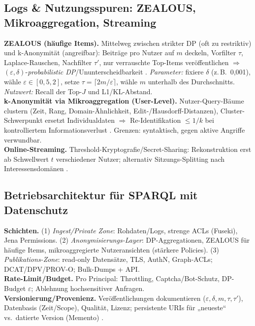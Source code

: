 \subsection{Logs \& Nutzungsspuren: ZEALOUS, Mikroaggregation, Streaming}
\textbf{ZEALOUS (häufige Items).} Mittelweg zwischen strikter DP (oft zu restriktiv) und k-Anonymität (angreifbar): Beiträge pro Nutzer auf $m$ deckeln, Vorfilter $\tau$, Laplace-Rauschen, Nachfilter $\tau'$, nur verrauschte Top-Items veröffentlichen $\Rightarrow$ $(\varepsilon,\delta)$-\emph{probabilistic DP}/Ununterscheidbarkeit \cite{GoetzZealous}. \emph{Parameter:} fixiere $\delta$ (z.\,B.\ 0{,}001), wähle $\varepsilon\in[0{,}5,2]$, setze $\tau=\lceil2m/\varepsilon\rceil$, wähle $m$ unterhalb des Durchschnitts. \emph{Nutzwert:} Recall der Top-$J$ und L1/KL-Abstand. \\
\textbf{k-Anonymität via Mikroaggregation (User-Level).} Nutzer-Query-Bäume clustern (Zeit, Rang, Domain-Ähnlichkeit, Edit-/Hausdorff-Distanzen), Cluster-Schwerpunkt ersetzt Individualdaten $\Rightarrow$ Re-Identifikation $\le 1/k$ bei kontrolliertem Informationsverlust \cite{NavarroUserKAnon}. Grenzen: syntaktisch, gegen aktive Angriffe verwundbar. \\
\textbf{Online-Streaming.} Threshold-Kryptografie/Secret-Sharing: Rekonstruktion erst ab Schwellwert $t$ verschiedener Nutzer; alternativ Sitzungs-Splitting nach Interessensdomänen \cite{AdarQueryLogs}.

\subsection{Betriebsarchitektur für SPARQL mit Datenschutz}
\label{sec:privacy-governance}
\textbf{Schichten.} (1) \emph{Ingest/Private Zone}: Rohdaten/Logs, strenge ACLs (Fuseki), Jena Permissions. (2) \emph{Anonymisierungs-Layer}: DP-Aggregationen, ZEALOUS für häufige Items, mikroaggregierte Nutzeransichten (stärkere Policies). (3) \emph{Publikations-Zone}: read-only Datensätze, TLS, AuthN, Graph-ACLs; DCAT/DPV/PROV-O; Bulk-Dumps + API. \\
\textbf{Rate-Limit/Budget.} Pro Principal: Throttling, Captcha/Bot-Schutz, DP-Budget $\varepsilon$; Ablehnung hochsensitiver Anfragen. \\
\textbf{Versionierung/Provenienz.} Veröffentlichungen dokumentieren ($\varepsilon,\delta,m,\tau,\tau'$), Datenbasis (Zeit/Scope), Qualität, Lizenz; persistente URIs für „neueste“ vs.\ datierte Version (Memento) \cite{W3CDWBP}.

